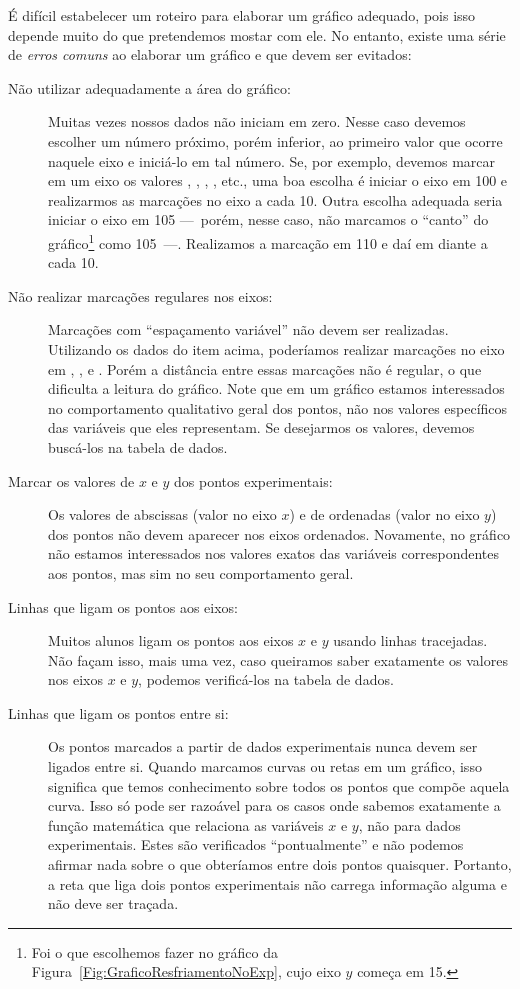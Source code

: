 É difícil estabelecer um roteiro para elaborar um gráfico adequado, pois isso depende muito do que pretendemos mostar com ele. No entanto, existe uma série de \emph{erros comuns} ao elaborar um gráfico e que devem ser evitados:
\begin{description}
	\item[Não utilizar adequadamente a área do gráfico:] Muitas vezes nossos dados não iniciam em zero. Nesse caso devemos escolher um número próximo, porém inferior, ao primeiro valor que ocorre naquele eixo e iniciá-lo em tal número. Se, por exemplo, devemos marcar em um eixo os valores , , , , etc., uma boa escolha é iniciar o eixo em 100 e realizarmos as marcações no eixo a cada 10. Outra escolha adequada seria iniciar o eixo em 105 ---~porém, nesse caso, não marcamos o ``canto'' do gráfico\footnote{Foi o que escolhemos fazer no gráfico da Figura~\ref{Fig:GraficoResfriamentoNoExp}, cujo eixo $y$ começa em 15.} como 105~---. Realizamos a marcação em 110 e daí em diante a cada 10.
	\item[Não realizar marcações regulares nos eixos:] Marcações com ``espaçamento variável'' não devem ser realizadas. Utilizando os dados do item acima, poderíamos realizar marcações no eixo em , ,  e . Porém a distância entre essas marcações não é regular, o que dificulta a leitura do gráfico. Note que em um gráfico estamos interessados no comportamento qualitativo geral dos pontos, não nos valores específicos das variáveis que eles representam. Se desejarmos os valores, devemos buscá-los na tabela de dados.
	\item[Marcar os valores de $x$ e $y$ dos pontos experimentais:] Os valores de abscissas (valor no eixo $x$) e de ordenadas (valor no eixo $y$) dos pontos não devem aparecer nos eixos ordenados. Novamente, no gráfico não estamos interessados nos valores exatos das variáveis correspondentes aos pontos, mas sim no seu comportamento geral.
	\item[Linhas que ligam os pontos aos eixos:] Muitos alunos ligam os pontos aos eixos $x$ e $y$ usando linhas tracejadas. Não façam isso, mais uma vez, caso queiramos saber exatamente os valores nos eixos $x$ e $y$, podemos verificá-los na tabela de dados.
	\item[Linhas que ligam os pontos entre si:] Os pontos marcados a partir de dados experimentais nunca devem ser ligados entre si. Quando marcamos curvas ou retas em um gráfico, isso significa que temos conhecimento sobre todos os pontos que compõe aquela curva. Isso só pode ser razoável para os casos onde sabemos exatamente a função matemática que relaciona as variáveis $x$ e $y$, não para dados experimentais. Estes são verificados ``pontualmente'' e não podemos afirmar nada sobre o que obteríamos entre dois pontos quaisquer. Portanto, a reta que liga dois pontos experimentais não carrega informação alguma e não deve ser traçada.

\end{description}
